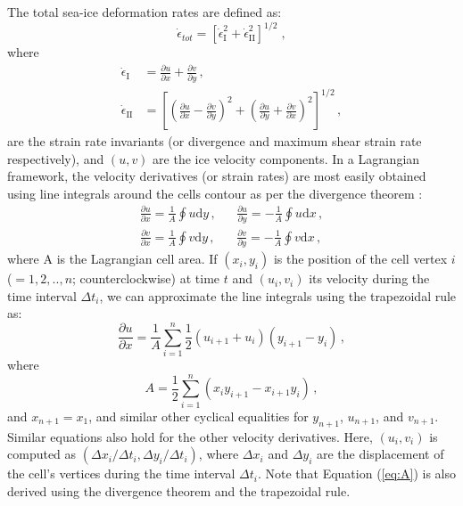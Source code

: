 \documentclass{article}
\begin{document}
    The total sea-ice deformation rates are defined as:
    \begin{equation}
        \dot{\epsilon}_{tot} = \left[ \dot{\epsilon}^2_{\mathrm{I}}+\dot{\epsilon}^2_{\mathrm{II}} \right]^{1/2} \;,
    \end{equation}
    where
    \begin{align}
        \dot{\epsilon}_{\mathrm{I}} &= \frac{\partial u}{\partial x}+\frac{\partial v}{\partial y} \, , \label{eq:eps_I} \\
        \dot{\epsilon}_{\mathrm{II}} &= \left[ \left( \frac{\partial u}{\partial x} - \frac{\partial v}{\partial y}\right)^{2} + \left( \frac{\partial u}{\partial y} + \frac{\partial v}{\partial x}\right)^{2}   \right]^{1/2} \, , \label{eq:eps_II}
    \end{align}
    are the strain rate invariants (or divergence and maximum shear strain rate respectively), and $(u,v)$ are the ice velocity components. In a Lagrangian framework, the velocity derivatives (or strain rates) are most easily obtained using line integrals around the cells contour as per the divergence theorem \citep{lindsay_seaice_2003}:
    \begin{align}
        \frac{\partial u}{\partial x}  = \frac{1}{A}\oint u \textrm{d}y \, ,&  & \frac{\partial u}{\partial y}  = -\frac{1}{A}\oint u \textrm{d}x \, , \nonumber \\
        \frac{\partial v}{\partial x}  = \frac{1}{A}\oint v \textrm{d}y \, ,&  & \frac{\partial v}{\partial y}  = -\frac{1}{A}\oint v \textrm{d}x\, ,
        \label{eq:dudx}
    \end{align}
    where A is the Lagrangian cell area. If $(x_{i}, y_{i})$ is the position of the cell vertex $i$ ($=1,2,..,n$; counterclockwise) at time $t$ and $(u_{i}, v_{i})$ its velocity during the time interval $\Delta t_{i}$, we can approximate the line integrals using the trapezoidal rule as:
    \begin{equation}
        \frac{\partial u}{\partial x}  = \frac{1}{A}\sum_{i=1}^{n}\frac{1}{2}\left( u_{i+1} + u_{i} \right)\left( y_{i+1} - y_{i} \right) \, ,
        \label{eq:dudx_sum}
    \end{equation}
    where
    \begin{equation}
        A = \frac{1}{2}\sum_{i=1}^{n}\left( x_{i}y_{i+1} -  x_{i+1}y_{i} \right)\, ,
        \label{eq:A}
    \end{equation}
    and $x_{n+1} = x_1$, and similar other cyclical equalities for $y_{n+1}$, $u_{n+1}$, and $v_{n+1}$. Similar equations also hold for the other velocity derivatives. Here, $(u_{i},v_{i})$ is computed as $(\Delta x_{i}/\Delta t_{i}, \Delta y_{i}/\Delta t_{i})$, where $\Delta x_{i}$ and $\Delta y_{i}$ are the displacement of the cell's vertices during the time interval $\Delta t_{i}$. Note that Equation (\ref{eq:A}) is also derived using the divergence theorem and the trapezoidal rule.




\end{document}
